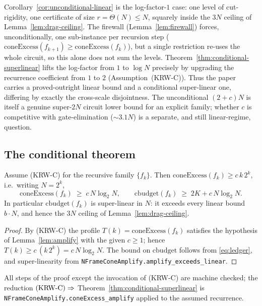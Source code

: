 \begin{remark}
Corollary~\ref{cor:unconditional-linear} is the log-factor-$1$ case: one level of
cut-rigidity, one certificate of size $r=\Theta(N)\le N$, squarely inside the
$3N$ ceiling of Lemma~\ref{lem:drag-ceiling}.  The firewall
(Lemma~\ref{lem:firewall}) forces, unconditionally, one sub-instance per
recursion step ($\mathrm{coneExcess}(f_{k+1})\ge\mathrm{coneExcess}(f_k)$), but a
single restriction re-uses the whole circuit, so this alone does not sum the
levels.  Theorem~\ref{thm:conditional-superlinear} lifts the log-factor from $1$
to $\log N$ precisely by upgrading the recurrence coefficient from $1$ to $2$
(Assumption~(KRW-C)).  Thus the paper carries a proved-outright linear bound and a
conditional super-linear one, differing by exactly the cross-scale disjointness.
The unconditional $(2+c)N$ is itself a genuine super-$2N$ circuit lower bound for
an explicit family; whether $c$ is competitive with gate-elimination ($\sim3.1N$)
is a separate, and still linear-regime, question.
\end{remark}

\subsection{The conditional theorem}

\begin{theorem}
\label{thm:conditional-superlinear}
Assume \textup{(KRW-C)} for the recursive family $\{f_k\}$.  Then
$\mathrm{coneExcess}(f_k)\ge c\,k\,2^{k}$, i.e.\ writing $N=2^{k}$,
\[
  \mathrm{coneExcess}(f_k)\;\ge\; c\,N\log_2 N,
  \qquad
  \mathrm{cbudget}(f_k)\;\ge\;2K + c\,N\log_2 N .
\]
In particular $\mathrm{cbudget}(f_k)$ is super-linear in $N$: it exceeds every
linear bound $b\cdot N$, and hence the $3N$ ceiling of Lemma~\ref{lem:drag-ceiling}.
\end{theorem}

\begin{proof}
By (KRW-C) the profile $T(k)=\mathrm{coneExcess}(f_k)$ satisfies the hypothesis of
Lemma~\ref{lem:amplify} with the given $c\ge 1$; hence $T(k)\ge c\,(k\,2^k)=
c\,N\log_2 N$.  The bound on $\mathrm{cbudget}$ follows from \eqref{eq:ledger},
and super-linearity from
\texttt{NFrameConeAmplify.amplify\_exceeds\_linear}.
\end{proof}

\noindent All steps of the proof except the invocation of (KRW-C) are machine
checked; the reduction $\textup{(KRW-C)}\Rightarrow$
Theorem~\ref{thm:conditional-superlinear} is
\texttt{NFrameConeAmplify.coneExcess\_amplify} applied to the assumed recurrence.

